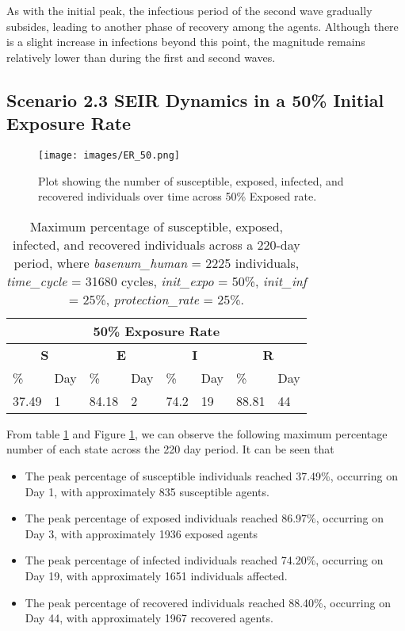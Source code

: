 As with the initial peak, the infectious period of the second wave gradually subsides, leading to another phase of recovery among the agents. Although there is a slight increase in infections beyond this point, the magnitude remains relatively lower than during the first and second waves.

\subsection{Scenario 2.3 SEIR Dynamics in a 50\% Initial Exposure Rate}
\begin{figure}[H]
	\centering
	\texttt{[image: images/ER\_50.png]}
	\caption{Plot showing the number of susceptible, exposed, infected, and recovered individuals over time across 50\% Exposed rate. }
	\label{fig:19}
\end{figure}
\begin{table} [H]
	\centering
	\begin{tabular}{|l|l|l|l|l|l|l|l|}
		\hline
		\multicolumn{8}{|c|}{\textbf{50\% Exposure Rate}}\\
		\hline
		\multicolumn{2}{|c|}{\textbf{S}} &  \multicolumn{2}{c|}{\textbf{E}}&  \multicolumn{2}{c|}{\textbf{I}}&  \multicolumn{2}{c|}{\textbf{R}}\\
		\hline
		\%& Day & \% & Day & \%  & Day & \% & Day \\
		\hline
		37.49& 1 &84.18& 2&  74.2& 19& 88.81&44\\
		\hline
	\end{tabular}
	\caption{Maximum percentage of susceptible, exposed, infected, and recovered individuals across a 220-day period, where \textit{basenum\_human} = 2225 individuals, \textit{time\_cycle} = 31680 cycles, \textit{init\_expo} = 50\%, \textit{init\_inf} = 25\%,  \textit{protection\_rate} = 25\%.}
	\label{ER3_Max}
\end{table}
From table \ref{ER3_Max} and Figure \ref{fig:19}, we can observe the following maximum percentage number of each state across the 220 day period. It can be seen that 

\begin{itemize}
	
	\item The peak percentage of susceptible individuals reached 37.49\%, occurring on Day 1, with approximately 835 susceptible agents.
	\item The peak percentage of exposed individuals reached 86.97\%, occurring on Day 3, with approximately 1936 exposed agents
	\item The peak percentage of infected individuals reached 74.20\%, occurring on Day 19, with approximately 1651 individuals affected.
	\item The peak percentage of recovered individuals reached 88.40\%, occurring on Day 44, with approximately 1967 recovered agents. 
\end{itemize}

